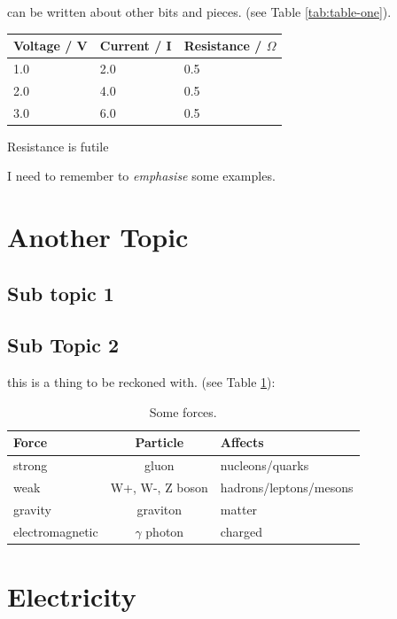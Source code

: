 \documentclass{tufte-handout}
\begin{document}
 can be written about other bits and pieces. (see Table \ref{tab:table-one}).

\begin{margintable}
  \centering
  \begin{tabular}{lll}
    \toprule
    Voltage / V & Current / I & Resistance / $\Omega$ \\
    \midrule
    1.0 & 2.0 & 0.5 \\
    2.0 & 4.0 & 0.5 \\
    3.0 & 6.0 & 0.5 \\
    \bottomrule
  \end{tabular}
  \caption{Resistance is futile}
  \label{tab:table-one}
\end{margintable}

 I need to remember to \emph{emphasise}  some examples. 

\section{Another Topic}
\subsection{Sub topic 1}
\subsection{Sub Topic 2}

 this is a thing to be reckoned with. (see Table \ref{tab:forces}):

\begin{table}
  \centering
  \begin{tabular}{lcl}
    \toprule
    Force & Particle & Affects \\
    \midrule
    strong & gluon & nucleons/quarks \\
    weak & W+, W-, Z boson & hadrons/leptons/mesons \\
    gravity & graviton & matter \\
    electromagnetic & $\gamma$ photon & charged \\
    \bottomrule
  \end{tabular}
  \caption{Some forces.}
  \label{tab:forces}
\end{table}

\section{Electricity}



\end{document}
